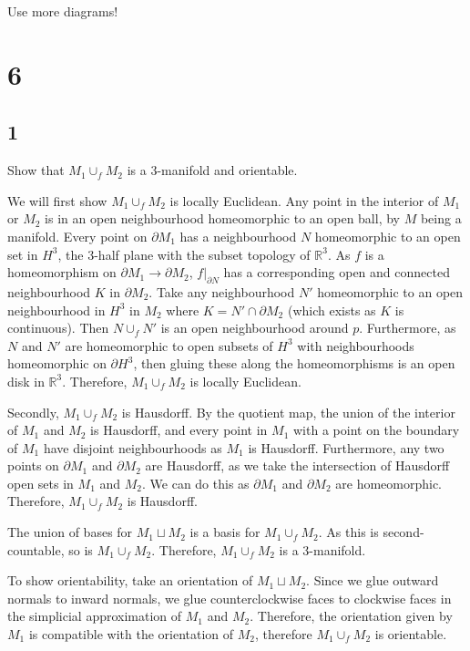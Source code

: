 \documentclass{article}
\theoremstyle{definition}
\numberwithin{theorem}{section}
\numberwithin{equation}{section}
\begin{document}
Use more diagrams!


\section{6}

\subsection{1}
Show that $M_1 \cup_f M_2$ is a 3-manifold and orientable. 

We will first show $M_1 \cup_f M_2$ is locally Euclidean. Any point in the interior of $M_1$ or $M_2$ is in an open neighbourhood homeomorphic to an open ball, by $M$ being a manifold. Every point on $\partial M_1$ has a neighbourhood $N$ homeomorphic to an open set in $H^3$, the $3$-half plane with the subset topology of $\mathbb{R}^3$. As $f$ is a homeomorphism on $\partial M_1 \rightarrow \partial M_2$, $f|_{\partial N}$ has a corresponding open and connected neighbourhood $K$ in $\partial M_2$. Take any neighbourhood $N'$ homeomorphic to an open neighbourhood in $H^3$ in $M_2$ where $K = N' \cap \partial M_2$ (which exists as $K$ is continuous). Then $N \cup_f N'$ is an open neighbourhood around $p$. Furthermore, as $N$ and $N'$ are homeomorphic to open subsets of $H^3$ with neighbourhoods homeomorphic on $\partial H^3$, then gluing these along the homeomorphisms is an open disk in $\mathbb{R}^3$. Therefore, $M_1 \cup_f M_2$ is locally Euclidean.

Secondly, $M_1 \cup_f M_2$ is Hausdorff. By the quotient map, the union of the interior of $M_1$ and $M_2$ is Hausdorff, and every point in $M_1$ with a point on the boundary of $M_1$ have disjoint neighbourhoods as $M_1$ is Hausdorff. Furthermore, any two points on $\partial M_1$ and $\partial M_2$ are Hausdorff, as we take the intersection of Hausdorff open sets in $M_1$ and $M_2$. We can do this as $\partial M_1$ and $\partial M_2$ are homeomorphic. Therefore, $M_1 \cup_f M_2$ is Hausdorff. 

The union of bases for $M_1 \sqcup M_2$ is a basis for $M_1 \cup_f M_2$. As this is second-countable, so is $M_1 \cup_f M_2$. Therefore, $M_1 \cup_f M_2$ is a $3$-manifold.

To show orientability, take an orientation of $M_1 \sqcup M_2$. Since we glue outward normals to inward normals, we glue counterclockwise faces to clockwise faces in the simplicial approximation of $M_1$ and $M_2$. Therefore, the orientation given by $M_1$ is compatible with the orientation of $M_2$, therefore $M_1 \cup_f M_2$ is orientable. 
\end{document}
